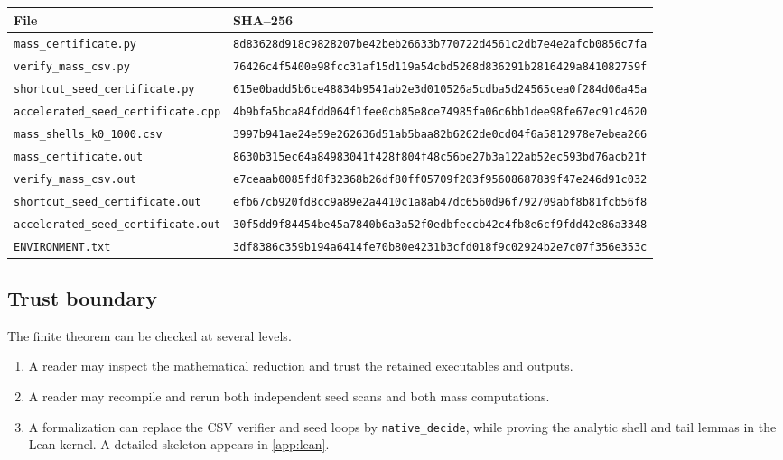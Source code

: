 \documentclass[11pt]{article}
\theoremstyle{definition}
\theoremstyle{remark}
\begin{document}
\begin{center}
\scriptsize
\begin{tabularx}{\textwidth}{@{}lX@{}}
\toprule
File & SHA--256\\
\midrule
\texttt{mass\_certificate.py} & \texttt{8d83628d918c9828207be42beb26633b770722d4561c2db7e4e2afcb0856c7fa}\\
\texttt{verify\_mass\_csv.py} & \texttt{76426c4f5400e98fcc31af15d119a54cbd5268d836291b2816429a841082759f}\\
\texttt{shortcut\_seed\_certificate.py} & \texttt{615e0badd5b6ce48834b9541ab2e3d010526a5cdba5d24565cea0f284d06a45a}\\
\texttt{accelerated\_seed\_certificate.cpp} & \texttt{4b9bfa5bca84fdd064f1fee0cb85e8ce74985fa06c6bb1dee98fe67ec91c4620}\\
\texttt{mass\_shells\_k0\_1000.csv} & \texttt{3997b941ae24e59e262636d51ab5baa82b6262de0cd04f6a5812978e7ebea266}\\
\texttt{mass\_certificate.out} & \texttt{8630b315ec64a84983041f428f804f48c56be27b3a122ab52ec593bd76acb21f}\\
\texttt{verify\_mass\_csv.out} & \texttt{e7ceaab0085fd8f32368b26df80ff05709f203f95608687839f47e246d91c032}\\
\texttt{shortcut\_seed\_certificate.out} & \texttt{efb67cb920fd8cc9a89e2a4410c1a8ab47dc6560d96f792709abf8b81fcb56f8}\\
\texttt{accelerated\_seed\_certificate.out} & \texttt{30f5dd9f84454be45a7840b6a3a52f0edbfeccb42c4fb8e6cf9fdd42e86a3348}\\
\texttt{ENVIRONMENT.txt} & \texttt{3df8386c359b194a6414fe70b80e4231b3cfd018f9c02924b2e7c07f356e353c}\\
\bottomrule
\end{tabularx}
\end{center}

\subsection{Trust boundary}

The finite theorem can be checked at several levels.

\begin{enumerate}[label=\textup{(\roman*)}]
\item A reader may inspect the mathematical reduction and trust the retained
executables and outputs.
\item A reader may recompile and rerun both independent seed scans and both
mass computations.
\item A formalization can replace the CSV verifier and seed loops by
\texttt{native\_decide}, while proving the analytic shell and tail lemmas in
the Lean kernel.  A detailed skeleton appears in \cref{app:lean}.
\end{enumerate}
\end{document}
